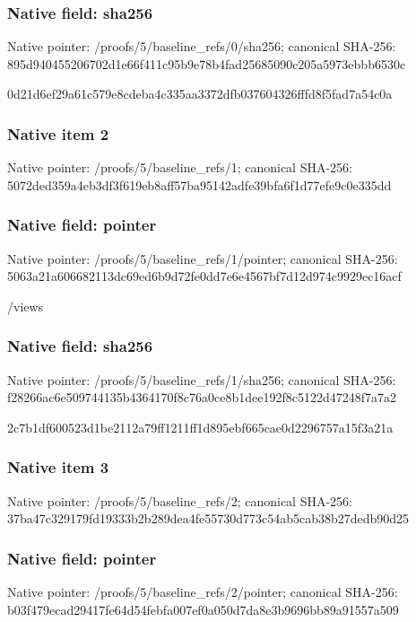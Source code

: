 \documentclass[10pt,a4paper]{article}
\begin{document}
\subsubsection{Native field: sha256}
Native pointer: /proofs/5/baseline\_\allowbreak{}refs/0/sha256; canonical SHA-256: 895d940455206702d1e66f411c95b9e78b4fad25685090c205a5973ebbb6530c

\begingroup\raggedright\sloppy 0d21d6ef29a61c579e8cdeba4c335aa3372dfb037604326fffd8f5fad7a54c0a\par\endgroup

\subsubsection{Native item 2}
Native pointer: /proofs/5/baseline\_\allowbreak{}refs/1; canonical SHA-256: 5072ded359a4eb3df3f619eb8aff57ba95142adfe39bfa6f1d77efe9c0e335dd

\subsubsection{Native field: pointer}
Native pointer: /proofs/5/baseline\_\allowbreak{}refs/1/pointer; canonical SHA-256: 5063a21a606682113dc69ed6b9d72fe0dd7e6e4567bf7d12d974c9929ec16acf

\begingroup\raggedright\sloppy /\allowbreak{}views\par\endgroup

\subsubsection{Native field: sha256}
Native pointer: /proofs/5/baseline\_\allowbreak{}refs/1/sha256; canonical SHA-256: f28266ac6e509744135b4364170f8c76a0ce8b1dee192f8c5122d47248f7a7a2

\begingroup\raggedright\sloppy 2c7b1df600523d1be2112a79ff1211ff1d895ebf665cae0d2296757a15f3a21a\par\endgroup

\subsubsection{Native item 3}
Native pointer: /proofs/5/baseline\_\allowbreak{}refs/2; canonical SHA-256: 37ba47c329179fd19333b2b289dea4fe55730d773c54ab5cab38b27dedb90d25

\subsubsection{Native field: pointer}
Native pointer: /proofs/5/baseline\_\allowbreak{}refs/2/pointer; canonical SHA-256: b03f479ecad29417fe64d54febfa007ef0a050d7da8e3b9696bb89a91557a509
\end{document}
